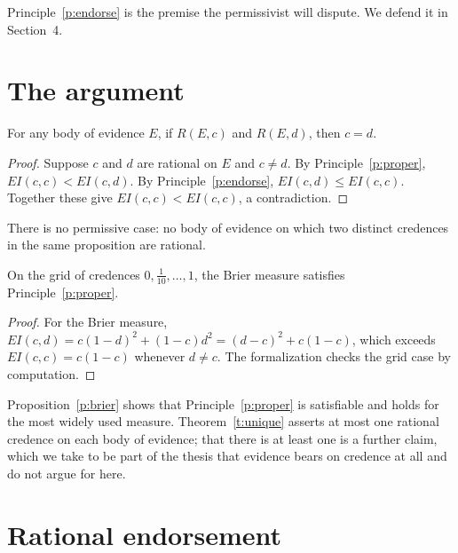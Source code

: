 \documentclass{situationist-preprint}
\begin{document}
Principle~\ref{p:endorse} is the premise the permissivist will dispute. We defend it in Section~4.

\section{The argument}

\begin{theorem}[Uniqueness]\label{t:unique}
For any body of evidence $E$, if $R(E,c)$ and $R(E,d)$, then $c = d$.
\end{theorem}

\begin{proof}
Suppose $c$ and $d$ are rational on $E$ and $c \neq d$. By Principle~\ref{p:proper}, $\mathit{EI}(c,c) < \mathit{EI}(c,d)$. By Principle~\ref{p:endorse}, $\mathit{EI}(c,d) \leq \mathit{EI}(c,c)$. Together these give $\mathit{EI}(c,c) < \mathit{EI}(c,c)$, a contradiction.
\end{proof}

\begin{corollary}\label{c:noperm}
There is no permissive case: no body of evidence on which two distinct credences in the same proposition are rational.
\end{corollary}

\begin{proposition}\label{p:brier}
On the grid of credences $0, \frac{1}{10}, \ldots, 1$, the Brier measure satisfies Principle~\ref{p:proper}.
\end{proposition}

\begin{proof}
For the Brier measure, $\mathit{EI}(c,d) = c(1-d)^2 + (1-c)d^2 = (d-c)^2 + c(1-c)$, which exceeds $\mathit{EI}(c,c) = c(1-c)$ whenever $d \neq c$. The formalization checks the grid case by computation.
\end{proof}

Proposition~\ref{p:brier} shows that Principle~\ref{p:proper} is satisfiable and holds for the most widely used measure. Theorem~\ref{t:unique} asserts at most one rational credence on each body of evidence; that there is at least one is a further claim, which we take to be part of the thesis that evidence bears on credence at all and do not argue for here.

\section{Rational endorsement}
\end{document}
